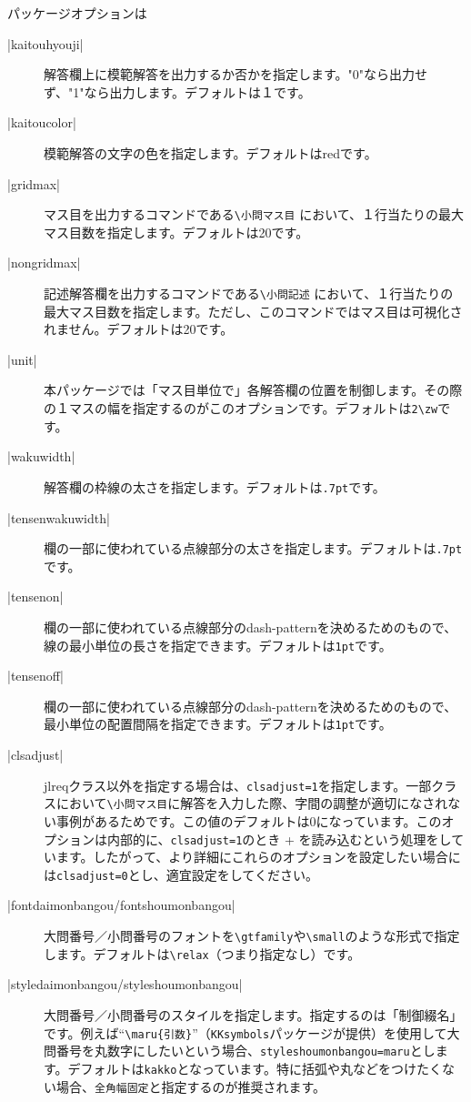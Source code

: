 \documentclass[luatex,fontsize=8pt,paper=b5,twoside]{jlreq}%
\makeatletter
\renewcommand{\gtfamily}{\gthira@pre\gthiraj@pre}
\makeatother
\begin{document}
パッケージオプションは

\begin{description}
  \item[\KKverb|kaitouhyouji|] 解答欄上に模範解答を出力するか否かを指定します。"0"なら出力せず、"1"なら出力します。デフォルトは１です。
  \item[\KKverb|kaitoucolor|] 模範解答の文字の色を指定します。デフォルトはredです。
  \item[\KKverb|gridmax|] マス目を出力するコマンドである\verb|\小問マス目| において、１行当たりの最大マス目数を指定します。デフォルトは20です。
  \item[\KKverb|nongridmax|] 記述解答欄を出力するコマンドである\verb|\小問記述| において、１行当たりの最大マス目数を指定します。ただし、このコマンドではマス目は可視化されません。デフォルトは20です。
  \item[\KKverb|unit|] 本パッケージでは「マス目単位で」各解答欄の位置を制御します。その際の１マスの幅を指定するのがこのオプションです。デフォルトは\verb|2\zw|です。
  \item[\KKverb|wakuwidth|] 解答欄の枠線の太さを指定します。デフォルトは\verb|.7pt|です。
  \item[\KKverb|tensenwakuwidth|] 欄の一部に使われている点線部分の太さを指定します。デフォルトは\verb|.7pt|です。
  \item[\KKverb|tensenon|] 欄の一部に使われている点線部分のdash-patternを決めるためのもので、線の最小単位の長さを指定できます。デフォルトは\verb|1pt|です。
  \item[\KKverb|tensenoff|] 欄の一部に使われている点線部分のdash-patternを決めるためのもので、最小単位の配置間隔を指定できます。デフォルトは\verb|1pt|です。
  \item[\KKverb|clsadjust|] jlreqクラス以外を指定する場合は、\verb|clsadjust=1|を指定します。一部クラスにおいて\verb|\小問マス目|に解答を入力した際、字間の調整が適切になされない事例があるためです。この値のデフォルトは0になっています。このオプションは内部的に、\verb|clsadjust=1|のとき
  \KKcodeS+
    \RequirePackage[scale=1]{luatexja-fontspec}
  \KKcodeE
  \noindent を読み込むという処理をしています。したがって、より詳細にこれらのオプションを設定したい場合には\verb|clsadjust=0|とし、適宜設定をしてください。
  \item[\KKverb|fontdaimonbangou/fontshoumonbangou|] 大問番号／小問番号のフォントを\verb|\gtfamily|や\verb|\small|のような形式で指定します。デフォルトは\verb|\relax|（つまり指定なし）です。
  \item[\KKverb|styledaimonbangou/styleshoumonbangou|] 大問番号／小問番号のスタイルを指定します。指定するのは「制御綴名」です。例えば``\verb|\maru{引数}|''（\verb|KKsymbols|パッケージが提供）を使用して大問番号を丸数字にしたいという場合、\verb|styleshoumonbangou=maru|とします。デフォルトは\verb|kakko|となっています。特に括弧や丸などをつけたくない場合、\verb|全角幅固定|と指定するのが推奨されます。
\end{description}
\end{document}
